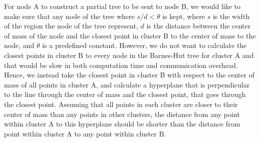 \documentclass{article}
\begin{document}
For node A to construct a partial tree to be sent to node B, we would like to make sure that any
node of the tree where \(s / d < \theta\) is kept, where \(s\) is the width of the region the node of
the tree represent, \(d\) is the distance between the center of mass of the node and the closest
point in cluster B to the center of mass to the node, and \(\theta\) is a predefined constant.
However, we do not want to calculate the closest points in cluster B to every node in the Barnes-Hut
tree for cluster A and that would be slow in both computation time and communication overhead.
Hence, we instead take the closest point in cluster B with respect to the center of mass of all
points in cluster A, and calculate a hyperplane that is perpendicular to the line through the center
of mass and the closest point, that goes through the closest point. Assuming that all points in
each cluster are closer to their center of mass than any points in other clusters, the distance from
any point within cluster A to this hyperplane should be shorter than the distance from point within
cluster A to any point within cluster B.
\end{document}
